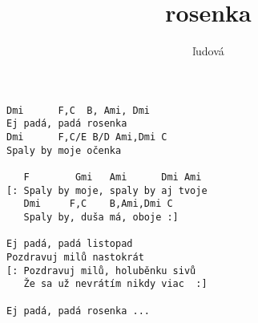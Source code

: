 \author{ľudová}
\title{rosenka}
\maketitle
\begin{verbatim}
Dmi      F,C  B, Ami, Dmi
Ej padá, padá rosenka
Dmi      F,C/E B/D Ami,Dmi C
Spaly by moje očenka

   F        Gmi   Ami      Dmi Ami
[: Spaly by moje, spaly by aj tvoje
   Dmi     F,C    B,Ami,Dmi C
   Spaly by, duša má, oboje :]

Ej padá, padá listopad
Pozdravuj milů nastokrát
[: Pozdravuj milů, holuběnku sivů
   Že sa už nevrátím nikdy viac  :]

Ej padá, padá rosenka ...
\end{verbatim}